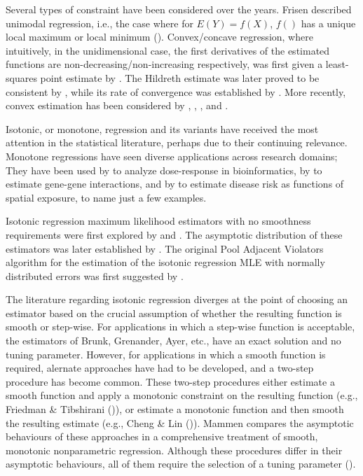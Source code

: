 \documentclass[10pt]{olplainarticle}\usepackage[]{graphicx}\usepackage[]{color}
\begin{document}
Several types of constraint have been considered over the years. Frisen described unimodal regression, i.e., the case where for $E(Y) = f(X)$, $f()$ has a unique local maximum or local minimum (\cite{unimodal}). Convex/concave regression, where intuitively, in the unidimensional case, the first derivatives of the estimated functions are non-decreasing/non-increasing respectively, was first given a least-squares point estimate by \cite{hildreth}. The Hildreth estimate was later proved to be consistent by \cite{hanson}, while its rate of convergence was established by \cite{mammenconvex}. More recently, convex estimation has been considered by \cite{seijo}, \cite{mazumder}, \cite{kuosmanen}, and \cite{groeneboom}.

Isotonic, or monotone, regression and its variants have received the most attention in the statistical literature, perhaps due to their continuing relevance. Monotone regressions have seen diverse applications across research domains; They have been used by \cite{jianhua} to analyze dose-response in bioinformatics, by \cite{luss} to estimate gene-gene interactions, and by \cite{diggle} to estimate disease risk as functions of spatial exposure, to name just a few examples. 

Isotonic regression maximum likelihood estimators with no smoothness requirements were first explored by \cite{brunk} and \cite{grenander}. The asymptotic distribution of these estimators was later established by \cite{wright}. The original Pool Adjacent Violators algorithm for the estimation of the isotonic regression MLE with normally distributed errors was first suggested by \cite{ayer}.

The literature regarding isotonic regression diverges at the point of choosing an estimator based on the crucial assumption of whether the resulting function is smooth or step-wise. For applications in which a step-wise function is acceptable, the estimators of Brunk, Grenander, Ayer, etc., have an exact solution and no tuning parameter. However, for applications in which a smooth function is required, alernate approaches have had to be developed, and a two-step procedure has become common. These two-step procedures either estimate a smooth function and apply a monotonic constraint on the resulting function (e.g., Friedman \& Tibshirani (\cite{friedman})), or estimate a monotonic function and then smooth the resulting estimate (e.g., Cheng \& Lin (\cite{cheng})). Mammen compares the asymptotic behaviours of these approaches in a comprehensive treatment of smooth, monotonic nonparametric regression. Although these procedures differ in their asymptotic behaviours, all of them require the selection of a tuning parameter (\cite{mammen}).
\end{document}
